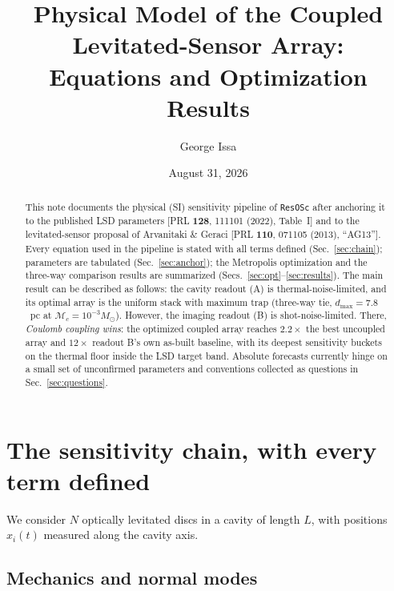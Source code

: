 \documentclass[11pt]{article}
\title{Physical Model of the Coupled Levitated-Sensor Array:\\
Equations and Optimization Results}
\author{George Issa}
\date{August 31, 2026}
\newcommand{\Mc}{\mathcal{M}_c}
\begin{document}
\maketitle

\begin{abstract}\noindent
This note documents the physical (SI) sensitivity pipeline of
\texttt{ResOSc} after anchoring it to the published LSD parameters
[PRL \textbf{128}, 111101 (2022), Table~I] and to the levitated-sensor
proposal of Arvanitaki \& Geraci [PRL \textbf{110}, 071105 (2013),
``AG13'']. Every equation used in the pipeline is stated with all terms
defined (Sec.~\ref{sec:chain}); parameters are tabulated
(Sec.~\ref{sec:anchor}); the Metropolis optimization and the three-way
comparison results are summarized (Secs.~\ref{sec:opt}--\ref{sec:results}).
The main result can be described as follows:
the cavity readout (A) is
thermal-noise-limited, and its optimal array is the uniform stack with
maximum trap (three-way tie, $d_{\max} = 7.8$~pc at
$\Mc = 10^{-3} M_\odot$). However, the imaging readout (B) is shot-noise-limited.
There, \emph{Coulomb coupling wins}: the optimized coupled array
reaches $2.2\times$ the best uncoupled array and $12\times$
readout B's own as-built baseline, with its deepest sensitivity buckets on the thermal floor
inside the LSD target band. Absolute forecasts currently hinge on a
small set of unconfirmed parameters and conventions collected as
questions in Sec.~\ref{sec:questions}.
\end{abstract}

\section{The sensitivity chain, with every term defined}
\label{sec:chain}

We consider $N$ optically levitated discs in a cavity of length $L$,
with positions $x_i(t)$ measured along the cavity axis.

\subsection{Mechanics and normal modes}
\end{document}
